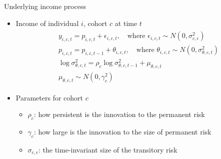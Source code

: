 \documentclass{beamer}
\begin{document}
\begin{frame}{Underlying income process}
	
	\begin{itemize}
		\item Income of individual $i$, cohort $c$ at time $t$ 
		\begin{eqnarray*}
			\begin{split}
				& y_{i,c,t} = p_{i,c,t}+ \epsilon_{i,c,t},\quad \textrm{where } \epsilon_{i,c,t} \sim N(0,\sigma^2_{c,\epsilon}) \\
				& p_{i,c,t} = p_{i,c,t-1} + \theta_{i,c,t}, \quad \textrm{where }  \theta_{i,c,t} \sim N(0,\sigma^2_{\theta,c,t} ) \\
				& \log\sigma^2_{\theta,c,t} = \rho_c \log\sigma^2_{\theta,c,t-1} + \mu_{\theta,c,t}  \\
				& \mu_{\theta,c,t} \sim N(0,\gamma_c^2)
			\end{split}
		\end{eqnarray*}

	
		\item Parameters for cohort $c$
		\begin{itemize}
			\item $\rho_{c}$: how persistent is the innovation to the permanent risk  
			\item $\gamma_c$: how large is the innovation to the size of permanent risk
			\item $\sigma_{c,\epsilon}$: the time-invariant size of the transitory risk
		\end{itemize}
	\end{itemize}
\end{frame}
\end{document}
